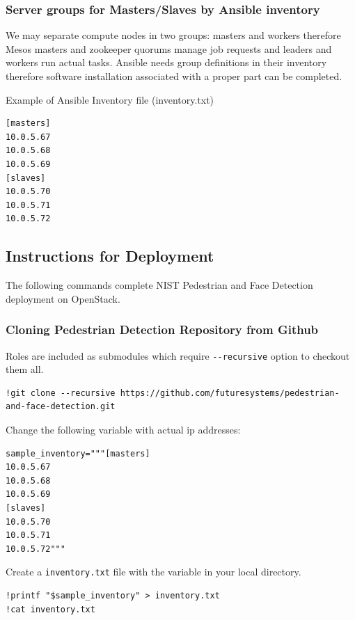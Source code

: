 \subsubsection{Server groups for Masters/Slaves by Ansible
inventory}\label{server-groups-for-mastersslaves-by-ansible-inventory}

We may separate compute nodes in two groups: masters and workers
therefore Mesos masters and zookeeper quorums manage job requests and
leaders and workers run actual tasks. Ansible needs group definitions in
their inventory therefore software installation associated with a proper
part can be completed.

Example of Ansible Inventory file (inventory.txt)

\begin{verbatim}
[masters]
10.0.5.67
10.0.5.68
10.0.5.69
[slaves]
10.0.5.70
10.0.5.71
10.0.5.72
\end{verbatim}

\subsection{Instructions for
Deployment}\label{instructions-for-deployment}

The following commands complete NIST Pedestrian and Face Detection
deployment on OpenStack.

\subsubsection{Cloning Pedestrian Detection Repository from
Github}\label{cloning-pedestrian-detection-repository-from-github}

Roles are included as submodules which require \texttt{-\/-recursive}
option to checkout them all.

\begin{verbatim}
!git clone --recursive https://github.com/futuresystems/pedestrian-and-face-detection.git
\end{verbatim}

Change the following variable with actual ip addresses:

\begin{verbatim}
sample_inventory="""[masters]
10.0.5.67
10.0.5.68
10.0.5.69
[slaves]
10.0.5.70
10.0.5.71
10.0.5.72"""
\end{verbatim}

Create a \texttt{inventory.txt} file with the variable in your local
directory.

\begin{verbatim}
!printf "$sample_inventory" > inventory.txt
!cat inventory.txt
\end{verbatim}

